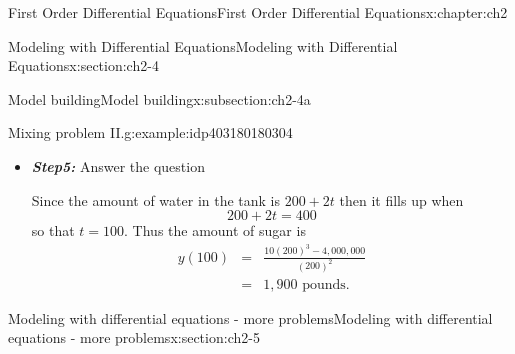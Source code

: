 \documentclass[oneside,10pt,]{book}
\newcommand{\alert}[1]{\textbf{\textit{#1}}}
\numberwithin{equation}{section}
\numberwithin{equation}{section}
\newcommand{\amp}{&}
\begin{document}
\begin{chapterptx}{First Order Differential Equations}{}{First Order Differential Equations}{}{}{x:chapter:ch2}
\begin{sectionptx}{Modeling with Differential Equations}{}{Modeling with Differential Equations}{}{}{x:section:ch2-4}
\begin{subsectionptx}{Model building}{}{Model building}{}{}{x:subsection:ch2-4a}
\begin{example}{Mixing problem II.}{g:example:idp403180180304}
\begin{itemize}[label=\textbullet]
\begin{equation*}
\end{equation*}
Thus using the formula, we have that%
\begin{align*}
y(t) \amp = \amp \frac{1}{\mu(t)}\left[\int\mu(t)b(t)dt.+C\right]\\
\amp = \amp \frac{1}{\left(100+t\right)^{2}}\left[30\int\left(100+t\right)^{2}dt.+C\right]\\
\amp = \amp \frac{1}{\left(100+t\right)^{2}}\left[30\frac{\left(100+t\right)^{3}}{3}.+C\right]\\
\amp = \amp \frac{1}{\left(100+t\right)^{2}}\left[10\left(100+t\right)^{3}+C\right]
\end{align*}
and using \(y(0)=600\) we get that%
\begin{equation*}
600=\frac{1}{100^{2}}\left[10\cdot100^{3}+C\right]
\end{equation*}
so that%
\begin{equation*}
C=-4,000,000
\end{equation*}
and thus%
\begin{equation*}
y(t)=\frac{10\left(100+t\right)^{3}-4,000,000}{\left(100+t\right)^{2}}.
\end{equation*}
%
\item{}\alert{Step5:} Answer the question%
\par
Since the amount of water in the tank is \(200+2t\) then it fills up when%
\begin{equation*}
200+2t=400
\end{equation*}
so that \(t=100\). Thus the amount of sugar is%
\begin{align*}
y(100) \amp = \amp \frac{10\left(200\right)^{3}-4,000,000}{\left(200\right)^{2}}\\
\amp = \amp 1,900\mbox{ pounds}.
\end{align*}
%
\end{itemize}
\end{example}
\end{subsectionptx}
\end{sectionptx}
%
%
\typeout{************************************************}
\typeout{************************************************}
%
\begin{sectionptx}{Modeling with differential equations - more problems}{}{Modeling with differential equations - more problems}{}{}{x:section:ch2-5}
%
%
\typeout{************************************************}
\typeout{************************************************}

\end{sectionptx}
\end{chapterptx}
\end{document}
